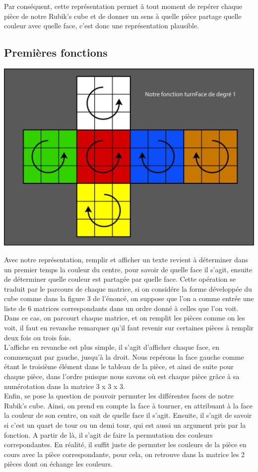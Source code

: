 \documentclass[a4paper,11pt]{article}
\theoremstyle{mytheor}
\begin{document}
Par conséquent, cette représentation permet à tout moment de repérer chaque pièce de notre Rubik's cube et de donner un sens à quelle pièce partage quelle couleur avec quelle face, c'est donc une représentation plausible.


\subsection{Premières fonctions}

\includegraphics[scale=0.25]{RubiksCube3.jpg}

Avec notre représentation, remplir et afficher un texte revient à déterminer dans un premier temps la couleur du centre, pour savoir de quelle face il s'agit, ensuite de déterminer quelle couleur est partagée par quelle face. Cette opération se traduit par le parcours de chaque matrice, si on considére la forme développée du cube comme dans la figure 3 de l'énoncé, on suppose que l'on a comme entrée une liste de 6 matrices correspondants dans un ordre donné à celles que l'on voit. Dans ce cas, on parcourt chaque matrice, et on remplit les pièces comme on les voit, il faut en revanche remarquer qu'il faut revenir sur certaines pièces à remplir deux fois ou trois fois. 
\\
L'affiche en revanche est plus simple, il s'agit d'afficher chaque face, en commençant par gauche, jusqu'à la droit. Nous repérons la face gauche comme étant le troisième élément dans le tableau de la pièce, et ainsi de suite pour chaque pièce, dans l'ordre puisque nous savons où est chaque pièce grâce à sa numérotation dans la matrice 3 x 3 x 3.
\\
Enfin, se pose la question de pouvoir permuter les différentes faces de notre Rubik's cube. Ainsi, on prend en compte la face à tourner, en attribuant à la face la couleur de son centre, on sait de quelle face il s'agit. Ensuite, il s'agit de savoir si c'est un quart de tour ou un demi tour, qui est aussi un argument pris par la fonction. A partir de là, il s'agit de faire la permutation des couleurs correpondantes. En réalité, il suffit juste de permuter les couleurs de la pièce en cours avec la pièce correspondante, pour cela, on retrouve dans la matrice les 2 pièces dont on échange les couleurs.
\end{document}
